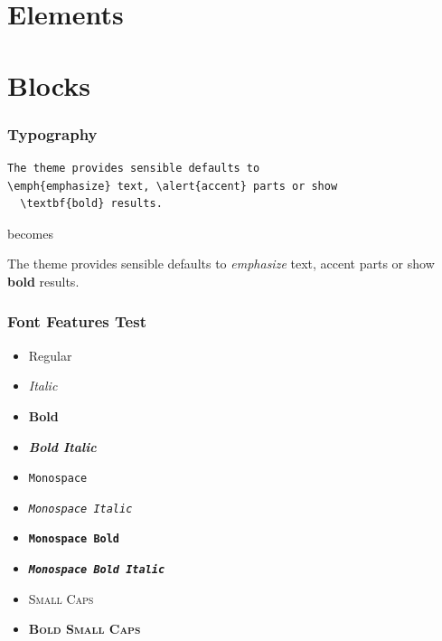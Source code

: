 \documentclass[10pt]{beamer}
\begin{document}
\section{Elements}

\section{Blocks}

\begin{frame}[fragile]
  \frametitle{Typography}
  \begin{verbatim}The theme provides sensible defaults to
\emph{emphasize} text, \alert{accent} parts or show
  \textbf{bold} results.
  \end{verbatim}
  \begin{center}
    becomes
  \end{center}
  The theme provides sensible defaults to \emph{emphasize} text,
  \alert{accent} parts or show \textbf{bold} results.
\end{frame}

\begin{frame}
  \frametitle{Font Features Test}
  \begin{itemize}
    \item Regular
    \item \textit{Italic}
    \item \textbf{Bold}
    \item \textbf{\textit{Bold Italic}}
    \item \texttt{Monospace}
    \item \texttt{\textit{Monospace Italic}}
    \item \texttt{\textbf{Monospace Bold}}
    \item \texttt{\textbf{\textit{Monospace Bold Italic}}}
    \item \textsc{Small Caps}
    \item \textbf{\textsc{Bold Small Caps}}
  \end{itemize}
\end{frame}
\end{document}
